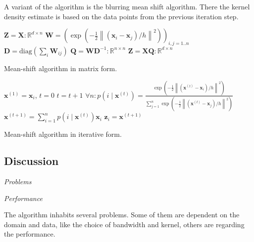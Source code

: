 \documentclass{article}
\newcommand{\norm}[1]{\left\lVert#1\right\rVert}
\begin{document}
A variant of the algorithm is the blurring mean shift algorithm. There the kernel density estimate is based on the data points from the previous iteration step.


\begin{algorithm}
	\begin{algorithmic}[1]
		\State $\bm{Z} = \bm{X} : \mathbb{R}^{d\times n}$
		\Repeat
		\State $\bm{W} = (\exp(-\frac{1}{2} \norm{(\bm{x}_i - \bm{x}_j) / h}^2))_{i,j = 1..n}$
		\State $\bm{D} = \text{diag}(\sum_i \bm{W}_{ij})$
		\State $\bm{Q} = \bm{W} \bm{D}^{-1} : \mathbb{R}^{n\times n}$
		\State $\bm{Z} = \bm{X} \bm{Q} : \mathbb{R}^{d\times n}$
		\State \Return {}
		\EndFunction
	\end{algorithmic}
	\caption{Mean-shift algorithm in matrix form.}
	\label{alg:mean-shift-algorithm-matrix-form}
\end{algorithm}

\begin{algorithm}
	\begin{algorithmic}[1]
		\State $\bm{x}^{(1)} = \bm{x}_i$, $t=0$
		\Repeat
		\State $t = t + 1$
		\State $\forall n: p(i \mid \bm{x}^{(t)}) = \frac{\exp(-\frac{1}{2} \norm{(\bm{x}^{(t)} - \bm{x}_i) / h}^2)}{\sum_{j=1}^n \exp(-\frac{1}{2} \norm{(\bm{x}^{(t)} - \bm{x}_j) / h }^2)}$
		\State $\bm{x}^{(t+1)} = \sum_{i=1}^n p(i \mid \bm{x}^{(t)}) \bm{x}_i$
		\Until{$\norm{\bm{x}^{(t+1)} - \bm{x}^{(t)}} < tol$}
		\State $\bm{z}_i = \bm{x}^{(t+1)}$
		\EndFor
		\State \Return {}
		\EndFunction
	\end{algorithmic}
	\caption{Mean-shift algorithm in iterative form.}
	\label{alg:mean-shift-algorithm-iterative-form}
\end{algorithm}



\subsection{Discussion} \label{sec:mean-shift-discussion}

\textit{Problems}

\textit{Performance}

The algorithm inhabits several problems. Some of them are dependent on the domain and data, like the choice of bandwidth and kernel, others are regarding the performance.
\end{document}
